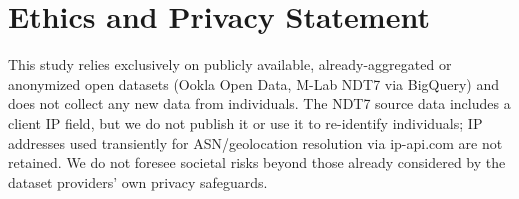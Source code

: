 \documentclass[sigconf,anonymous,review]{acmart}
\begin{document}
\section*{Ethics and Privacy Statement}
This study relies exclusively on publicly available, already-aggregated or
anonymized open datasets (Ookla Open Data, M-Lab NDT7 via BigQuery) and
does not collect any new data from individuals. The NDT7 source data
includes a client IP field, but we do not publish it or use it to
re-identify individuals; IP addresses used transiently for
ASN/geolocation resolution via ip-api.com are not retained. We do not
foresee societal risks beyond those already considered by the dataset
providers' own privacy safeguards.



\end{document}
